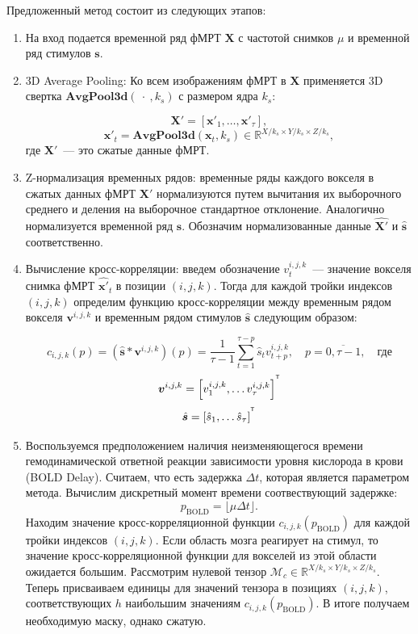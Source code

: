 \documentclass[a4paper, 12pt]{extarticle}
\begin{document}
Предложенный метод состоит из следующих этапов:
\begin{enumerate}
    \item На вход подается временной ряд фМРТ $\bm{X}$ с частотой снимков $\mu$ и временной ряд стимулов $\bm{s}$.
    \item 3D Average Pooling: Ко всем изображениям фМРТ в $\bm{X}$ применяется 3D свертка $\textbf{AvgPool3d}(~\cdot~,  k_s)$ с размером ядра $k_s$:

    \begin{equation*}
    \bm{X}' = \left[\bm{x}'_1, \dots, \bm{x}'_{\tau}\right],
    \end{equation*}
    \begin{equation*}
    \bm{x}'_t = \textbf{AvgPool3d}(\bm{x}_t, k_s) \in \mathbb{R}^{X/ k_s \times Y/ k_s \times Z/ k_s}, 
    \end{equation*}
    где $\bm{X}'$~--- это сжатые данные фМРТ.
    \item Z-нормализация временных рядов: временные ряды каждого вокселя в сжатых данных фМРТ $\bm{X}'$ нормализуются путем вычитания их выборочного среднего и деления на выборочное стандартное отклонение. Аналогично нормализуется временной ряд $\bm{s}$. Обозначим нормализованные данные $\hat{\bm{X}'}$ и $\hat{\bm{s}}$ соответственно. 


    \item Вычисление кросс-корреляции: введем обозначение $v^{i,j,k}_t$~--- значение вокселя снимка фМРТ $\hat{\bm{x}'}_t$ в позиции $(i,j,k)$. Тогда для каждой тройки индексов $(i,j,k)$ определим функцию кросс-корреляции между временным рядом вокселя $\bm{v}^{i,j,k}$ и временным рядом стимулов $\hat{\bm{s}}$ следующим образом:
    
    \begin{equation*}
        c_{i,j,k}(p) = \left(\hat{\bm{s}} * \bm{v}^{i,j,k}\right)(p)=\dfrac{1}{\tau-1}\sum_{t=1}^{\tau-p} \hat{s}_{t}v^{i,j,k}_{t+p}, \quad p = \overline{0, \tau-1},\quad \text{где}
    \end{equation*}
        $$\bm{v}^{i,j,k}=\left[v^{i,j,k}_1, \dots v^{i,j,k}_{\tau}\right]^{^{\mathsf{T}}}$$
        $$\hat{\bm{s}} = \left[\hat{s}_1, \dots \hat{s}_{\tau}\right]^{^{\mathsf{T}}}$$ 


    \item Воспользуемся предположением наличия неизменяющегося времени гемодинамической ответной реакции зависимости уровня кислорода в крови (BOLD Delay). Считаем, что есть задержка $\Delta t$, которая является параметром метода. Вычислим дискретный момент времени соотвествующий задержке:
    $$p_{\text{BOLD}} = \lfloor\mu\Delta t \rfloor.$$
    Находим значение кросс-корреляционной функции $c_{i,j,k}(p_{\text{BOLD}})$ для каждой тройки индексов $(i,j,k)$. 
	Если область мозга реагирует на стимул, то значение кросс-корреляционной функции для вокселей из этой области ожидается большим.
	Рассмотрим нулевой тензор $\mathcal{M}_c \in \mathbb{R}^{X/ k_s \times Y/ k_s \times Z/ k_s}$.
	Теперь присваиваем единицы для значений тензора в позициях $(i,j,k)$, соответствующих $h$ наибольшим значениям $c_{i,j,k}(p_{\text{BOLD}})$. В итоге получаем необходимую маску, однако сжатую.


\end{enumerate}
\end{document}

